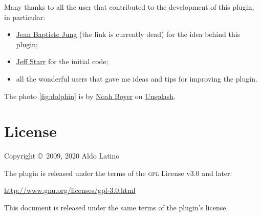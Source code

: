 	Many thanks to all the user that contributed to the development of this
	plugin, in particular:

	\begin{itemize}
		\item
		\href{http://www.wprecipes.com/add-private-notes-to-your-wordpress-blog-posts}{Jean
		Baptiste Jung} (the link is currently dead) for the idea behind this
		plugin;
		\item \href{http://digwp.com/2010/05/private-content-posts-shortcode}{Jeff Starr}
		for the initial code;
		\item all the wonderful users that gave me ideas and tips for improving
		the plugin.
	\end{itemize}

	The photo \ref{fig:dolphin} is by \href{https://unsplash.com/@emerald_}{Noah
	Boyer} on \href{https://unsplash.com}{Unsplash}.

	\section*{License}

	Copyright \copyright~2009, 2020  Aldo Latino

	\noindent The plugin is released under the terms of the \textsc{gpl} License
	v3.0 and later:

	\begin{center}
		\url{http://www.gnu.org/licenses/gpl-3.0.html}
	\end{center}

	\noindent This document is released under the same terms of the plugin's
	license.
\endgroup